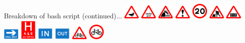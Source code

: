 \begin{frame}{Breakdown of bash script (continued)...}
{\includegraphics[width=0.06\textwidth]{Motivation/Signs/551.2}
\includegraphics[width=0.06\textwidth]{Motivation/Signs/552}
\includegraphics[width=0.06\textwidth]{Motivation/Signs/555}
\includegraphics[width=0.06\textwidth]{Motivation/Signs/562}
\includegraphics[width=0.06\textwidth]{Motivation/Signs/670V20}
\includegraphics[width=0.06\textwidth]{Motivation/Signs/7001}
\includegraphics[width=0.06\textwidth]{Motivation/Signs/770}
\includegraphics[width=0.06\textwidth]{Motivation/Signs/810}
\includegraphics[width=0.06\textwidth]{Motivation/Signs/827.2}
\includegraphics[width=0.06\textwidth]{Motivation/Signs/833}
\includegraphics[width=0.06\textwidth]{Motivation/Signs/834}
\includegraphics[width=0.06\textwidth]{Motivation/Signs/950}
\includegraphics[width=0.06\textwidth]{Motivation/Signs/951}
}
\end{frame}
